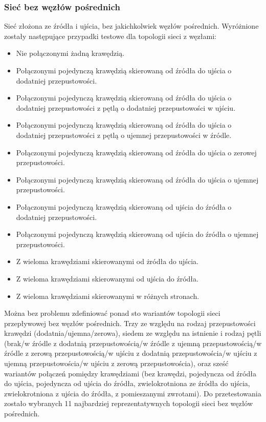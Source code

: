 \subsubsection{Sieć bez węzłów pośrednich}
Sieć złożona ze źródła i ujścia, bez jakichkolwiek węzłów pośrednich. Wyróżnione
zostały następujące przypadki testowe dla topologii sieci z węzłami:
\begin{itemize}[nosep]
    \item Nie połączonymi żadną krawędzią.
    \item Połączonymi pojedynczą krawędzią skierowaną od źródła do ujścia o dodatniej przepustowości.
    \item Połączonymi pojedynczą krawędzią skierowaną od źródła do ujścia o dodatniej przepustowości z pętlą o dodatniej przepustowości w ujściu.
    \item Połączonymi pojedynczą krawędzią skierowaną od źródła do ujścia o dodatniej przepustowości z pętlą o ujemnej przepustowości w źródle.
    \item Połączonymi pojedynczą krawędzią skierowaną od źródła do ujścia o zerowej przepustowości.
    \item Połączonymi pojedynczą krawędzią skierowaną od źródła do ujścia o ujemnej przepustowości.
    \item Połączonymi pojedynczą krawędzią skierowaną od ujścia do źródła o dodatniej przepustowości.
    \item Połączonymi pojedynczą krawędzią skierowaną od ujścia do źródła o ujemnej przepustowości.
    \item Z wieloma krawędziami skierowanymi od żródła do ujścia.
    \item Z wieloma krawędziami skierowanymi od ujścia do źródła.
    \item Z wieloma krawędziami skierowanymi w różnych stronach.
\end{itemize}
Można bez problemu zdefiniować ponad sto wariantów topologii sieci przepływowej
bez węzłów pośrednich. Trzy ze względu na rodzaj przepustowości krawędzi
(dodatnia/ujemna/zerowa), siedem ze względu na istnienie i rodzaj pętli (brak/w
źródle z dodatnią przepustowością/w źródle z ujemną przepustowością/w źródle z
zerową przepustowością/w ujściu z dodatnią przepustowościa/w ujściu z ujemną
przepustowościa/w ujściu z zerową przepustowościa), oraz sześć wariantów
połączeń pomiędzy krawędziami (bez krawędzi, pojedyncza od źródła do ujścia,
pojedyncza od ujścia do źródła, zwielokrotniona ze źródła do ujścia,
zwielokrotniona z ujścia do źródła, z pomieszanymi zwrotami). Do przetestowania
zostało wybranych 11 najbardziej reprezentatywnych topologii sieci bez węzłów
pośrednich.


